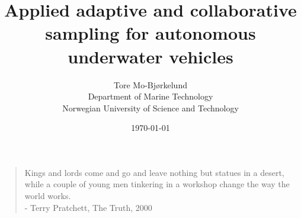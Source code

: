 \documentclass[british,titlepage]{ntnuthesis}
\title{Applied adaptive and collaborative sampling for autonomous underwater vehicles}
\author{Tore Mo-Bjørkelund \\ Department of Marine Technology \\ Norwegian University of Science and Technology}
\date{\today}
\begin{document}
\begin{quote}
    Kings and lords come and go and leave nothing but statues in a desert, while a couple of young men tinkering in a workshop change the way the world works. \\
     - Terry Pratchett, The Truth, 2000
\end{quote}





\tableofcontents
\listoffigures
\listoftables
\lstlistoflistings

\printglossary[type=\acronymtype] %
\printglossary                    %








\chapter*{\bibname}
\printbibliography[heading=none]

%

\appendix

\end{document}
